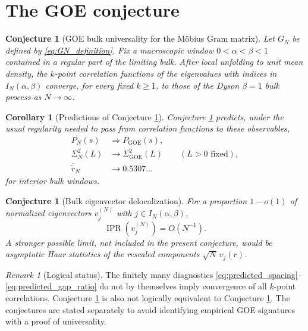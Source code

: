 \documentclass[11pt]{amsart}
\numberwithin{equation}{section}
\theoremstyle{plain}
\newtheorem{corollary}[theorem]{Corollary}
\newtheorem{conjecture}[theorem]{Conjecture}
\theoremstyle{definition}
\theoremstyle{remark}
\newtheorem{remark}[theorem]{Remark}
\newcommand{\IPR}{\operatorname{IPR}}
\newcommand{\GOE}{\mathrm{GOE}}
\begin{document}
\section{The GOE conjecture}
\label{sec:goe_conjecture}

\begin{conjecture}[GOE bulk universality for the M\"obius Gram matrix]
\label{conj:goe_bulk_universality}
Let $G_N$ be defined by \eqref{eq:GN_definition}.  Fix a macroscopic window $0<\alpha<\beta<1$ contained in a regular part of the limiting bulk.  After local unfolding to unit mean density, the $k$-point correlation functions of the eigenvalues with indices in $I_N(\alpha,\beta)$ converge, for every fixed $k\ge1$, to those of the Dyson $\beta=1$ bulk process as $N\to\infty$.
\end{conjecture}

\begin{corollary}[Predictions of Conjecture \ref{conj:goe_bulk_universality}]
\label{cor:goe_predictions}
Conjecture \ref{conj:goe_bulk_universality} predicts, under the usual regularity needed to pass from correlation functions to these observables,
\begin{align}
P_N(s)&\Longrightarrow P_{\GOE}(s),
\label{eq:predicted_spacing}\\
\Sigma_N^2(L)&\longrightarrow\Sigma_{\GOE}^2(L)
\qquad(L>0\text{ fixed}),
\label{eq:predicted_number_variance}\\
\overline{\widetilde r}_N&\longrightarrow0.5307\ldots
\label{eq:predicted_gap_ratio}
\end{align}
for interior bulk windows.
\end{corollary}

\begin{conjecture}[Bulk eigenvector delocalization]
\label{conj:bulk_delocalization}
For a proportion $1-o(1)$ of normalized eigenvectors $v_j^{(N)}$ with $j\in I_N(\alpha,\beta)$,
\begin{equation}
\IPR\!\left(v_j^{(N)}\right)=O(N^{-1}).
\label{eq:ipr_conjecture}
\end{equation}
A stronger possible limit, not included in the present conjecture, would be asymptotic Haar statistics of the rescaled components $\sqrt N\,v_j(r)$.
\end{conjecture}

\begin{remark}[Logical status]
\label{rem:not_equivalent_diagnostics}
The finitely many diagnostics \eqref{eq:predicted_spacing}--\eqref{eq:predicted_gap_ratio} do not by themselves imply convergence of all $k$-point correlations.  Conjecture \ref{conj:bulk_delocalization} is also not logically equivalent to Conjecture \ref{conj:goe_bulk_universality}.  The conjectures are stated separately to avoid identifying empirical GOE signatures with a proof of universality.
\end{remark}
\end{document}
